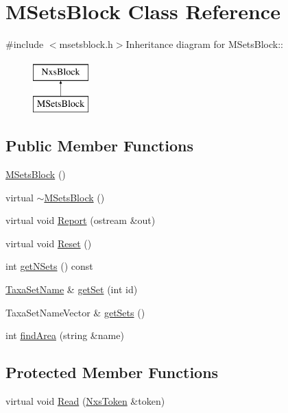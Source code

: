 \hypertarget{classMSetsBlock}{
\section{MSetsBlock Class Reference}
\label{classMSetsBlock}
}


{\ttfamily \#include $<$msetsblock.h$>$}Inheritance diagram for MSetsBlock::\begin{figure}[H]
\begin{center}
\leavevmode
\includegraphics[height=2cm]{classMSetsBlock}
\end{center}
\end{figure}
\subsection*{Public Member Functions}
\begin{DoxyCompactItemize}
\item 
\hyperlink{classMSetsBlock_a46e45cb2258e0c5295d2c22ed8a03333}{MSetsBlock} ()
\item 
virtual \hyperlink{classMSetsBlock_aec8a27486caa13efccfcef0420287c31}{$\sim$MSetsBlock} ()
\item 
virtual void \hyperlink{classMSetsBlock_a88203ea243140fc5402abfecb41ee2c7}{Report} (ostream \&out)
\item 
virtual void \hyperlink{classMSetsBlock_a64e9ca54bba770d1a663de30dfca2073}{Reset} ()
\item 
int \hyperlink{classMSetsBlock_a0950179c8789b05e53fafc981281e694}{getNSets} () const 
\item 
\hyperlink{structTaxaSetName}{TaxaSetName} \& \hyperlink{classMSetsBlock_ac38f25bafc3eaaa704e3bc3d892f3783}{getSet} (int id)
\item 
TaxaSetNameVector \& \hyperlink{classMSetsBlock_af7a44d6b45025b01b20ba612e72c2f4d}{getSets} ()
\item 
int \hyperlink{classMSetsBlock_aae67ce46658428cb5a1793f5ead91ea8}{findArea} (string \&name)
\end{DoxyCompactItemize}
\subsection*{Protected Member Functions}
\begin{DoxyCompactItemize}
\item 
virtual void \hyperlink{classMSetsBlock_ada321520d3bf38ec70c09e8e4568d2fd}{Read} (\hyperlink{classNxsToken}{NxsToken} \&token)
\end{DoxyCompactItemize}
